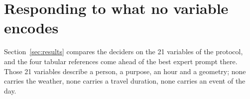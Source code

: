 

\section{Responding to what no variable encodes}
\label{sec:untabulated}

Section~\ref{sec:results} compares the deciders on the 21 variables of the protocol, and the four tabular references come ahead of the best expert prompt there. Those 21 variables describe a person, a purpose, an hour and a geometry; none carries the weather, none carries a travel duration, none carries an event of the day.

